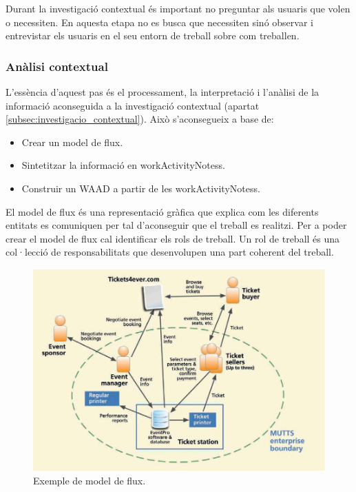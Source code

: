 Durant la investigació contextual és important no preguntar als usuaris que volen o necessiten. En aquesta etapa no es busca que necessiten sinó observar i entrevistar els usuaris en el seu entorn de treball sobre com treballen.


\subsubsection{Anàlisi contextual}\label{subsec:analisi_contextual}
L'essència d'aquest pas és el processament, la interpretació i l'anàlisi de la informació aconseguida a la investigació contextual (apartat \ref{subsec:investigacio_contextual}). Això s'aconsegueix a base de:

\begin{itemize}
\item Crear un model de flux.
\item Sintetitzar la informació en \glspl{workActivityNotes}.
\item Construir un \ac{WAAD} a partir de les \glspl{workActivityNotes}.
\end{itemize}

El model de flux és una representació gràfica que explica com les diferents entitats es comuniquen per tal d'aconseguir que el treball es realitzi. Per a poder crear el model de flux cal identificar els rols de treball. Un rol de treball és una col·lecció de responsabilitats que desenvolupen una part coherent del treball.

\begin{figure}[htp]
\centering
\includegraphics[scale=0.6]{flow_model_example.png}
\caption{Exemple de model de flux.}\label{fig:flow_model_example}
\end{figure}

